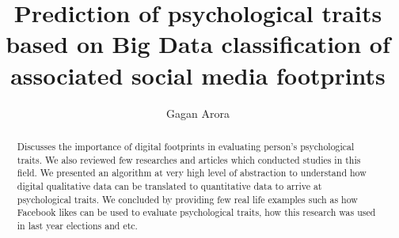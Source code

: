 \documentclass[sigconf]{acmart}
\begin{document}
\title{Prediction of psychological traits based on Big Data classification of associated social media footprints}


\author{Gagan Arora}
\orcid{}

\renewcommand{\shortauthors}{Gagan Arora}


\begin{abstract}
Discusses the importance of digital footprints in evaluating person's psychological traits. We also reviewed few researches
and articles which conducted studies in this field. We presented an algorithm at very high level of abstraction to understand
how digital qualitative data can be translated to quantitative data to arrive at psychological traits. We concluded by providing
few real life examples such as how Facebook likes can be used to evaluate psychological traits, how this research was used in 
last year elections and etc.  

\end{abstract}



\maketitle
\end{document}

